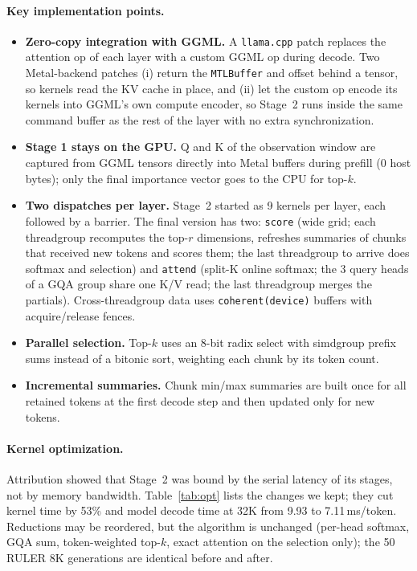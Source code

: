 \documentclass[10pt,letterpaper]{article}
\newcommand{\code}[1]{\texttt{#1}}
\begin{document}
\paragraph{Key implementation points.}
\begin{itemize}
\item \textbf{Zero-copy integration with GGML.} A \code{llama.cpp} patch replaces the attention op of each layer with a custom GGML op during decode. Two Metal-backend patches (i) return the \code{MTLBuffer} and offset behind a tensor, so kernels read the KV cache in place, and (ii) let the custom op encode its kernels into GGML's own compute encoder, so Stage~2 runs inside the same command buffer as the rest of the layer with no extra synchronization.
\item \textbf{Stage 1 stays on the GPU.} Q and K of the observation window are captured from GGML tensors directly into Metal buffers during prefill (0 host bytes); only the final importance vector goes to the CPU for top-$k$.
\item \textbf{Two dispatches per layer.} Stage~2 started as 9 kernels per layer, each followed by a barrier. The final version has two: \code{score} (wide grid; each threadgroup recomputes the top-$r$ dimensions, refreshes summaries of chunks that received new tokens and scores them; the last threadgroup to arrive does softmax and selection) and \code{attend} (split-K online softmax; the 3 query heads of a GQA group share one K/V read; the last threadgroup merges the partials). Cross-threadgroup data uses \code{coherent(device)} buffers with acquire/release fences.
\item \textbf{Parallel selection.} Top-$k$ uses an 8-bit radix select with simdgroup prefix sums instead of a bitonic sort, weighting each chunk by its token count.
\item \textbf{Incremental summaries.} Chunk min/max summaries are built once for all retained tokens at the first decode step and then updated only for new tokens.
\end{itemize}

\paragraph{Kernel optimization.}
Attribution showed that Stage~2 was bound by the serial latency of its stages, not by memory bandwidth. Table~\ref{tab:opt} lists the changes we kept; they cut kernel time by 53\% and model decode time at 32K from 9.93 to 7.11\,ms/token. Reductions may be reordered, but the algorithm is unchanged (per-head softmax, GQA sum, token-weighted top-$k$, exact attention on the selection only); the 50 RULER 8K generations are identical before and after.
\end{document}
